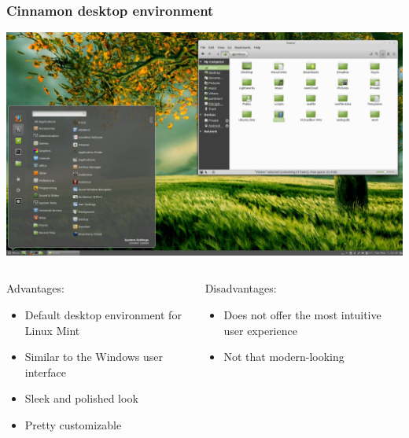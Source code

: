 \begin{frame}
	\frametitle{Cinnamon desktop environment}
	
	\begin{center}
		\includegraphics[width=.7\linewidth]{../graphics/desktop_examples/cinnamon.png}
	\end{center}%
	
	\vspace{-\baselineskip}
	
	\begin{columns}
		\begin{column}[t]{.7\linewidth}
			\begin{exampleblock}{Advantages:}
				\begin{itemize}
					\item Default desktop environment for Linux Mint
					\item Similar to the Windows user interface
					\item Sleek and polished look
					\item Pretty customizable
				\end{itemize}
			\end{exampleblock}
		\end{column}
		\hfill
		\begin{column}[t]{.28\linewidth}
			\begin{alertblock}{Disadvantages:}
				\begin{itemize}
					\item Does not offer the most intuitive user experience
					\item Not that modern-looking
				\end{itemize}
			\end{alertblock}
		\end{column}
	\end{columns}
	\hfill
\end{frame}
